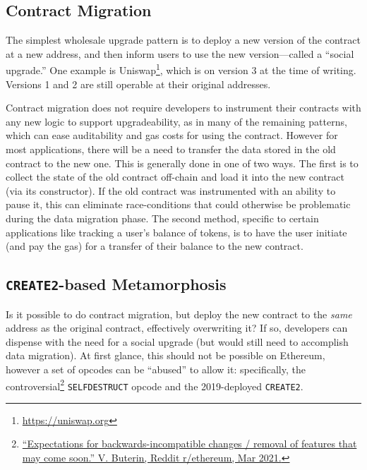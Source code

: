 
\subsection{Contract Migration}
\label{sec:migration}

The simplest wholesale upgrade pattern is to deploy a new version of the contract at a new address, and then inform users to use the new version---called a ``social upgrade.'' One example is Uniswap\footnote{\url{https://uniswap.org}}, which is on version 3 at the time of writing. Versions 1 and 2 are still operable at their original addresses. 

Contract migration does not require developers to instrument their contracts with any new logic to support upgradeability, as in many of the remaining patterns, which can ease auditability and gas costs for using the contract. However for most applications, there will be a need to transfer the data stored in the old contract to the new one. This is generally done in one of two ways. The first is to collect the state of the old contract off-chain and load it into the new contract (\eg via its constructor). If the old contract was instrumented with an ability to pause it, this can eliminate race-conditions that could otherwise be problematic during the data migration phase. The second method, specific to certain applications like tracking a user's balance of tokens, is to have the user initiate (and pay the gas) for a transfer of their balance to the new contract.
 

\subsection{\texttt{CREATE2}-based Metamorphosis}
\label{sec:metamorphic}

Is it possible to do contract migration, but deploy the new contract to the \textit{same} address as the original contract, effectively overwriting it? If so, developers can dispense with the need for a social upgrade (but would still need to accomplish data migration). At first glance, this should not be possible on Ethereum, however a set of opcodes can be ``abused'' to allow it: specifically, the controversial\footnote{\href{https://www.reddit.com/r/ethereum/comments/lx32kv/expectations\_for\_backwardsincompatible\_changes/}{``Expectations for backwards-incompatible changes / removal of features that may come soon.'' V. Buterin, Reddit r/ethereum, Mar 2021.}} \texttt{SELFDESTRUCT} opcode and the 2019-deployed \texttt{CREATE2}. 

